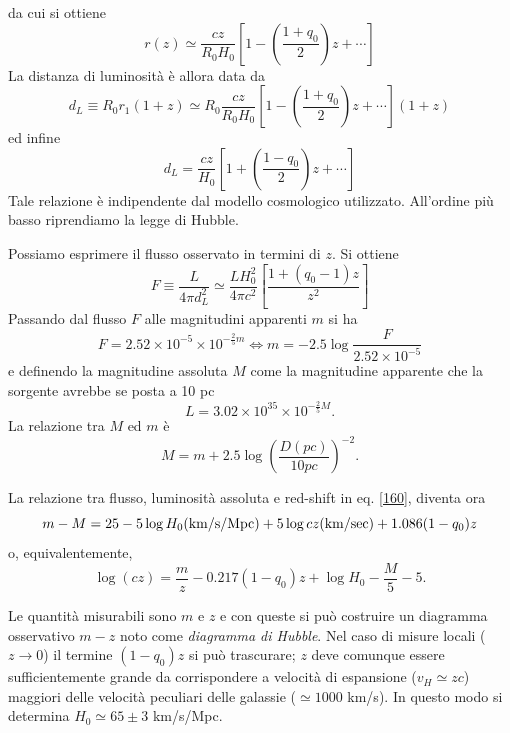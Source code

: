 da cui si ottiene
\begin{equation}
  r(z) \simeq \frac{cz}{R_0 H_0} \left[ 1- \left( \frac{1+q_0}{2}\right) z +
    \cdots \right]
\end{equation}
La distanza di luminosità è allora data da
\begin{equation}
  d_L \equiv R_0 r_1 (1+z)
  \simeq R_0 \frac{cz}{R_0 H_0} \left[ 1 - \left( \frac{1+q_0}{2} \right) z +
    \cdots \right] (1+z)
\end{equation}
ed infine
\begin{equation}
  d_L = \frac{cz}{H_0} \left[ 1 + \left( \frac{1-q_0}{2} \right) z + \cdots \right]
  \label{1468}
\end{equation}
Tale relazione è indipendente dal modello cosmologico utilizzato. All'ordine più
basso riprendiamo la legge di Hubble.

Possiamo esprimere il flusso osservato in termini di $z$.  Si ottiene
\begin{equation}
  F \equiv \frac{L}{4 \pi d^2_L} \simeq \frac{L H^2_0}{4 \pi c^2}
  \left[ \frac {1+\left (q_0-1 \right) z}{z^2} \right]
  \label{160}
\end{equation}
Passando dal flusso $F$ alle magnitudini apparenti $m$ si ha
\begin{equation}
  F = 2.52 \times 10^{-5} \times 10^{-\frac{2}{5} m} \iff
  m = -2.5 \log \frac {F}{2.52 \times 10^{-5}}
\end{equation}
e definendo la magnitudine assoluta $M$ come la magnitudine apparente
che la sorgente avrebbe se posta a 10 pc
\begin{equation}
  L = 3.02 \times 10^{35} \times 10^{-\frac{2}{5} M}.
\end{equation}
La relazione tra $M$ ed $m$ è
\begin{equation}
  M = m +2.5 \log \left( \frac{D(pc)}{10 pc}\right)^{-2}.
\end{equation}

La relazione tra flusso, luminosità assoluta e red-shift in eq. \eqref{160},
diventa ora
\begin{equation}
  m-M = 25 - 5 \log H_0 {\rm(km/s/Mpc)}+ 5 \log cz {\rm (km/sec)}+ 1.086 (1-q_0)
  z
\end{equation}
o, equivalentemente,
\begin{equation}
  \log (cz) = \frac{m}{z} - 0.217 (1-q_0)z +\log H_0 - \frac{M}{5} -5.
\end{equation}

Le quantità misurabili sono $m$ e $z$ e con queste si può costruire un diagramma
osservativo $m-z$ noto come \emph{diagramma di Hubble}.  Nel caso di misure
locali ($z \to 0$) il termine $(1-q_0)z$ si può trascurare; $z$ deve comunque
essere sufficientemente grande da corrispondere a velocità di espansione ($v_H
\simeq zc$) maggiori delle velocità peculiari delle galassie ($\simeq 1000$
km/s).  In questo modo si determina $H_0 \simeq 65 \pm 3$ km/s/Mpc.

